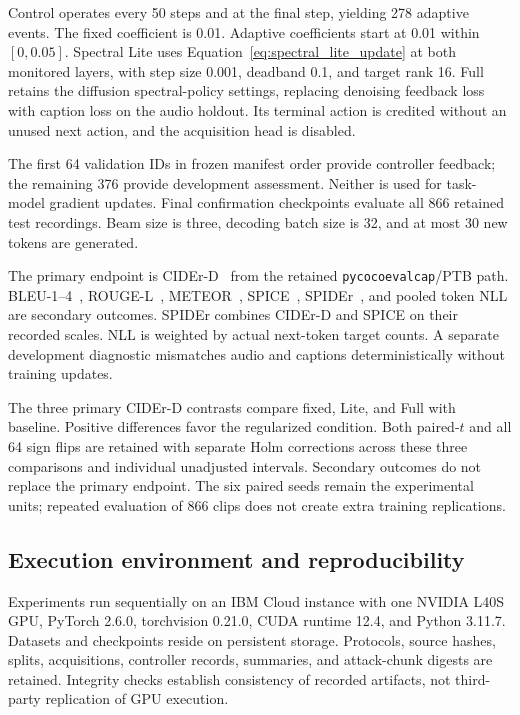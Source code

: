 \documentclass[a4paper,fleqn]{cas-dc}
\begin{document}
Control operates every 50 steps and at the final step,
yielding 278 adaptive events.
The fixed coefficient is 0.01.
Adaptive coefficients start at 0.01 within $[0,0.05]$.
Spectral Lite uses Equation~\eqref{eq:spectral_lite_update} at both
monitored layers, with step size 0.001, deadband 0.1, and target rank 16.
Full retains the diffusion spectral-policy settings, replacing
denoising feedback loss with caption loss on the audio holdout.
Its terminal action is credited without an unused next action,
and the acquisition head is disabled.

The first 64 validation IDs in frozen manifest order provide
controller feedback; the remaining 376 provide development
assessment. Neither is used for task-model gradient updates.
Final confirmation checkpoints evaluate all 866 retained test
recordings.
Beam size is three, decoding batch size is 32, and at most
30 new tokens are generated.

The primary endpoint is CIDEr-D~\cite{vedantam2015cider}
from the retained \texttt{pycocoevalcap}/PTB path.
BLEU-1--4~\cite{papineni2002bleu},
ROUGE-L~\cite{lin2004rouge},
METEOR~\cite{denkowski2014meteor},
SPICE~\cite{anderson2016spice},
SPIDEr~\cite{liu2017spider}, and pooled token NLL are
secondary outcomes.
SPIDEr combines CIDEr-D and SPICE on their recorded scales.
NLL is weighted by actual next-token target counts.
A separate development diagnostic mismatches audio and captions
deterministically without training updates.

The three primary CIDEr-D contrasts compare fixed, Lite,
and Full with baseline.
Positive differences favor the regularized condition.
Both paired-$t$ and all 64 sign flips are retained with
separate Holm corrections across these three comparisons
and individual unadjusted intervals.
Secondary outcomes do not replace the primary endpoint.
The six paired seeds remain the experimental units;
repeated evaluation of 866 clips does not create extra
training replications.


\subsection{Execution environment and reproducibility}

Experiments run sequentially on an IBM Cloud instance with one
NVIDIA L40S GPU, PyTorch 2.6.0, torchvision 0.21.0,
CUDA runtime 12.4, and Python 3.11.7.
Datasets and checkpoints reside on persistent storage.
Protocols, source hashes, splits, acquisitions, controller records,
summaries, and attack-chunk digests are retained.
Integrity checks establish consistency of recorded artifacts,
not third-party replication of GPU execution.
\end{document}
